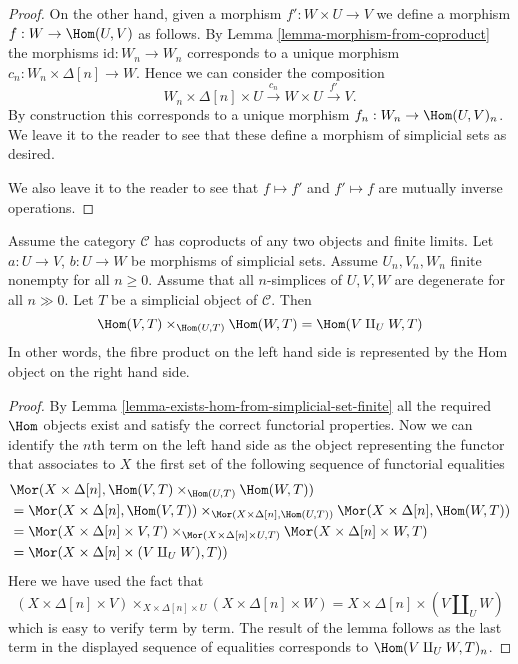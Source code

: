 \begin{proof}
\medskip\noindent
On the other hand, given a morphism
$f' : W \times U \to V$ we define
a morphism $f : W \to \Hom(U, V)$
as follows. By Lemma \ref{lemma-morphism-from-coproduct} the morphisms
$\text{id} : W_n \to W_n$ corresponds to a unique
morphism $c_n : W_n \times \Delta[n] \to W$.
Hence we can consider the composition
$$
W_n \times \Delta[n] \times U
\xrightarrow{c_n}
W \times U
\xrightarrow{f'}
V.
$$
By construction this corresponds to a unique morphism
$f_n : W_n \to \Hom(U, V)_n$. We leave it to the reader
to see that these define a morphism of simplicial sets as
desired.

\medskip\noindent
We also leave it to the reader to see that
$f \mapsto f'$ and $f' \mapsto f$ are mutually inverse
operations.
\end{proof}

\begin{lemma}
\label{lemma-hom-from-coprod}
Assume the category $\mathcal{C}$
has coproducts of any two objects and finite
limits. Let $a : U \to V$, $b : U \to W$
be morphisms of simplicial sets.
Assume $U_n, V_n, W_n$ finite nonempty for all $n \geq 0$.
Assume that all $n$-simplices of $U, V, W$
are degenerate for all $n \gg 0$.
Let $T$ be a simplicial object of $\mathcal{C}$.
Then
$$
\Hom(V, T) \times_{\Hom(U, T)} \Hom(W, T)
=
\Hom(V \amalg_U W, T)
$$
In other words, the fibre product on the left hand
side is represented by the Hom object on the right hand side.
\end{lemma}

\begin{proof}
By Lemma \ref{lemma-exists-hom-from-simplicial-set-finite}
all the required $\Hom$ objects exist and satisfy the
correct functorial properties. Now we can identify
the $n$th term on the left hand side as the object
representing the functor that associates to $X$
the first set of the following sequence of functorial
equalities
\begin{align*}
&
\Mor(X \times \Delta[n],
\Hom(V, T) \times_{\Hom(U, T)} \Hom(W, T)) \\
& =
\Mor(X \times \Delta[n], \Hom(V, T))
\times_{\Mor(X \times \Delta[n], \Hom(U, T))}
\Mor(X \times \Delta[n], \Hom(W, T)) \\
& =
\Mor(X \times \Delta[n] \times V, T)
\times_{\Mor(X \times \Delta[n] \times U, T)}
\Mor(X \times \Delta[n] \times W, T) \\
& =
\Mor(X \times \Delta[n] \times (V \amalg_U W), T))
\end{align*}
Here we have used the fact that
$$
(X \times \Delta[n] \times V)
\times_{X \times \Delta[n] \times U}
(X \times \Delta[n] \times W)
=
X \times \Delta[n] \times (V \amalg_U W)
$$
which is easy to verify term by term. The result of the lemma
follows as the last term in the displayed sequence of
equalities corresponds to $\Hom(V \amalg_U W, T)_n$.
\end{proof}














